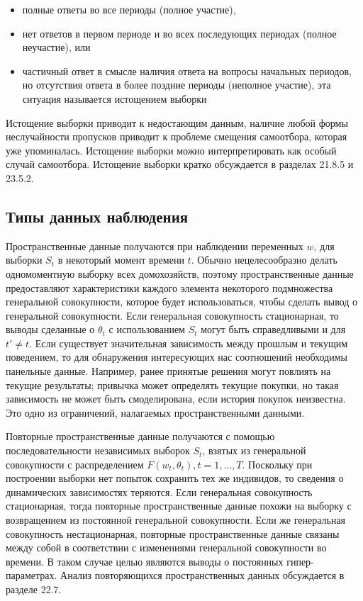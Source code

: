 \begin{itemize}
\item полные ответы во все периоды (полное участие),
\item нет ответов в первом периоде и во всех последующих периодах (полное неучастие), или
\item частичный ответ в смысле наличия ответа на вопросы начальных периодов, но отсутствия ответа в более поздние периоды (неполное участие), эта ситуация называется истощением выборки
\end{itemize}


Истощение выборки приводит к недостающим данным, наличие любой формы неслучайности пропусков приводит к проблеме смещения самоотбора, которая уже упоминалась. Истощение выборки можно интерпретировать как особый случай самоотбора. Истощение выборки кратко обсуждается в разделах 21.8.5 и 23.5.2.

\subsection{Типы данных наблюдения}

Пространственные данные получаются при наблюдении переменных $w$, для выборки $S_{t}$ в некоторый момент времени $t$. Обычно нецелесообразно делать одномоментную выборку всех домохозяйств, поэтому пространственные данные предоставляют характеристики каждого элемента некоторого подмножества генеральной совокупности, которое будет использоваться, чтобы сделать вывод о генеральной совокупности. Если генеральная совокупность стационарная, то выводы сделанные о $\theta_{t}$ с использованием $S_{t}$ могут быть справедливыми и для $t'\neq t$. Если существует значительная зависимость между прошлым и текущим поведением, то для обнаружения интересующих нас соотношений необходимы панельные данные. Например, ранее принятые решения могут повлиять на текущие результаты; привычка может определять текущие покупки, но такая зависимость не может быть смоделирована, если история покупок неизвестна. Это одно из ограничений, налагаемых пространственными данными.


Повторные пространственные данные получаются с помощью последовательности независимых выборок $S_{t}$, взятых из генеральной совокупности с распределением $F(w_{t},\theta_{t}), t=1, \dots, T$. Поскольку при построении выборки нет попыток сохранить тех же индивидов, то сведения о динамических зависимостях теряются. Если генеральная совокупность стационарная, тогда повторные пространственные данные похожи на  выборку с возвращением из постоянной генеральной совокупности. Если же генеральная совокупность нестационарная, повторные пространственные данные  связаны между собой в соответствии с изменениями генеральной совокупности во времени. В таком случае целью являются выводы о постоянных гипер-параметрах. Анализ повторяющихся пространственных данных обсуждается в разделе 22.7.


